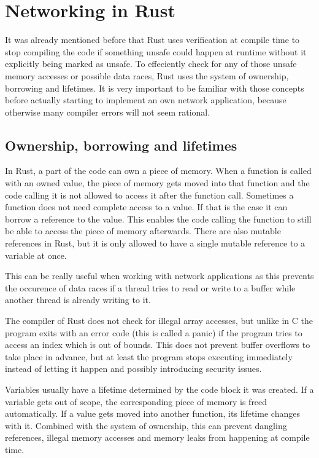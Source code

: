 
\section{Networking in Rust}
It was already mentioned before that Rust uses verification at compile time to stop compiling the code if something
unsafe could happen at runtime without it explicitly being marked as unsafe. To effeciently check for any of those
unsafe memory accesses or possible data races, Rust uses the system of ownership, borrowing and lifetimes. It is very
important to be familiar with those concepts before actually starting to implement an own network application, because
otherwise many compiler errors will not seem rational.

\subsection{Ownership, borrowing and lifetimes}
In Rust, a part of the code can own a piece of memory. When a function is called with an owned value, the piece of
memory gets moved into that function and the code calling it is not allowed to access it after the function call.
Sometimes a function does not need complete access to a value. If that is the case it can borrow a reference to the
value. This enables the code calling the function to still be able to access the piece of memory afterwards. There are
also mutable references in Rust, but it is only allowed to have a single mutable reference to a variable at once.

This can be really useful when working with network applications as this prevents the occurence of data races if a
thread tries to read or write to a buffer while another thread is already writing to it.

The compiler of Rust does not check for illegal array accesses, but unlike in C the program exits with an error code
(this is called a panic) if the program tries to access an index which is out of bounds. This does not prevent buffer
overflows to take place in advance, but at least the program stops executing immediately instead of letting it happen
and possibly introducing security issues.

Variables usually have a lifetime determined by the code block it was created. If a variable gets out of scope, the
corresponding piece of memory is freed automatically. If a value gets moved into another function, its lifetime changes
with it. Combined with the system of ownership, this can prevent dangling references, illegal memory accesses and
memory leaks from happening at compile time. \cite{c15safe}

